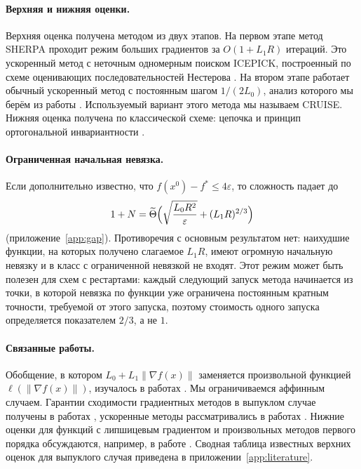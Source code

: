 \documentclass[11pt,a4paper]{article}
\newcommand{\norm}[1]{\|#1\|}
\begin{document}
\paragraph{Верхняя и нижняя оценки.} Верхняя оценка получена методом из двух этапов. На первом этапе метод SHERPA проходит режим больших градиентов за $O(1+L_1R)$ итераций. Это ускоренный метод с неточным одномерным поиском ICEPICK, построенный по схеме оценивающих последовательностей Нестерова \citep{nesterov2018lectures}. На втором этапе работает обычный ускоренный метод с постоянным шагом $1/(2L_0)$, анализ которого мы берём из работы \citet{tyurin2026accelerated}. Используемый вариант этого метода мы называем CRUISE. Нижняя оценка получена по классической схеме: цепочка и принцип ортогональной инвариантности \citep{nemirovski1983problem,nesterov2018lectures,carmon2020lower}.

\paragraph{Ограниченная начальная невязка.} Если дополнительно известно, что $f(x^0)-f^\ast\le4\varepsilon$, то сложность падает до
\[
 1+N=\widetilde\Theta\Bigl(\sqrt{\frac{L_0R^2}{\varepsilon}}+(L_1R)^{2/3}\Bigr)
\]
(приложение~\ref{app:gap}). Противоречия с основным результатом нет: наихудшие функции, на которых получено слагаемое $L_1R$, имеют огромную начальную невязку и в класс с ограниченной невязкой не входят. Этот режим может быть полезен для схем с рестартами: каждый следующий запуск метода начинается из точки, в которой невязка по функции уже ограничена постоянным кратным точности, требуемой от этого запуска, поэтому стоимость одного запуска определяется показателем $2/3$, а не $1$.

\paragraph{Связанные работы.} Обобщение, в котором $L_0+L_1\norm{\nabla f(x)}$ заменяется произвольной функцией $\ell(\norm{\nabla f(x)})$, изучалось в работах \citet{li2023generalized,tyurin2025unified}. Мы ограничиваемся аффинным случаем. Гарантии сходимости градиентных методов в выпуклом случае получены в работах \citet{gorbunov2024methods,vankov2025optimizing,lobanov2025linear}, ускоренные методы рассматривались в работах \citet{gorbunov2024methods,vankov2025optimizing,tyurin2026accelerated,borodich2026graal}. Нижние оценки для функций с липшицевым градиентом и произвольных методов первого порядка обсуждаются, например, в работе \citet{guzman2015lower}. Сводная таблица известных верхних оценок для выпуклого случая приведена в приложении~\ref{app:literature}.
\end{document}
